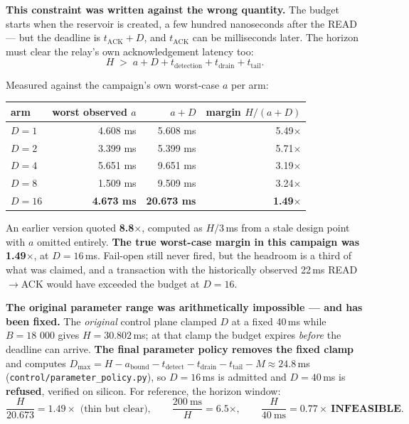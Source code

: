 \documentclass[10pt,a4paper,oneside]{article}
\newenvironment{keybox}{\begin{snugshade}\noindent\ignorespaces}{\end{snugshade}}
\newcommand{\num}[1]{\mbox{#1}}
\newcommand{\code}[1]{\texttt{\small #1}}
\begin{document}
\begin{keybox}
\textbf{This constraint was written against the wrong quantity.} The budget starts
when the reservoir is created, a few hundred nanoseconds after the READ --- but the deadline
is $t_{\mathrm{ACK}}+D$, and $t_{\mathrm{ACK}}$ can be milliseconds later. The horizon must
clear the relay's own acknowledgement latency too:
\[
H \;>\; a + D + t_{\text{detection}} + t_{\text{drain}} + t_{\text{tail}} .
\]
\end{keybox}

Measured against the campaign's own worst-case $a$ per arm:

\begin{center}
\begin{tabular}{lrrr}
\toprule
\textbf{arm} & \textbf{worst observed $a$} & \textbf{$a+D$} & \textbf{margin $H/(a+D)$} \\
\midrule
$D=1$  & \num{4.608} ms & \num{5.608} ms & 5.49$\times$ \\
$D=2$  & \num{3.399} ms & \num{5.399} ms & 5.71$\times$ \\
$D=4$  & \num{5.651} ms & \num{9.651} ms & 3.19$\times$ \\
$D=8$  & \num{1.509} ms & \num{9.509} ms & 3.24$\times$ \\
\textbf{$D=16$} & \textbf{\num{4.673} ms} & \textbf{\num{20.673} ms} & \textbf{1.49$\times$} \\
\bottomrule
\end{tabular}
\end{center}

An earlier version quoted \textbf{8.8$\times$}, computed as $H/3$\,ms from a stale design
point with $a$ omitted entirely. \textbf{The true worst-case margin in this campaign was
1.49$\times$}, at $D=16$\,ms. Fail-open still never fired, but the headroom is a third of
what was claimed, and a transaction with the historically observed 22\,ms READ$\to$ACK
would have exceeded the budget at $D=16$.

\textbf{The original parameter range was arithmetically impossible --- and has been fixed.}
The \emph{original} control plane clamped $D$ at a fixed 40\,ms while $B=\num{18 000}$ gives
$H=\num{30.802}$\,ms; at that clamp the budget expires \emph{before} the deadline can arrive.
\textbf{The final parameter policy removes the fixed clamp} and computes
$D_{\max}=H-a_{\text{bound}}-t_{\text{detect}}-t_{\text{drain}}-t_{\text{tail}}-M\approx\num{24.8}$\,ms
(\code{control/parameter\_policy.py}), so $D=16$\,ms is admitted and $D=40$\,ms is
\textbf{refused}, verified on silicon. For reference, the
horizon window:
\[
\frac{H}{\num{20.673}} = 1.49\times \text{ (thin but clear)},
\qquad
\frac{200\ \mathrm{ms}}{H} = 6.5\times,
\qquad
\frac{H}{40\ \mathrm{ms}} = 0.77\times \ \textbf{INFEASIBLE}.
\]
\end{document}
